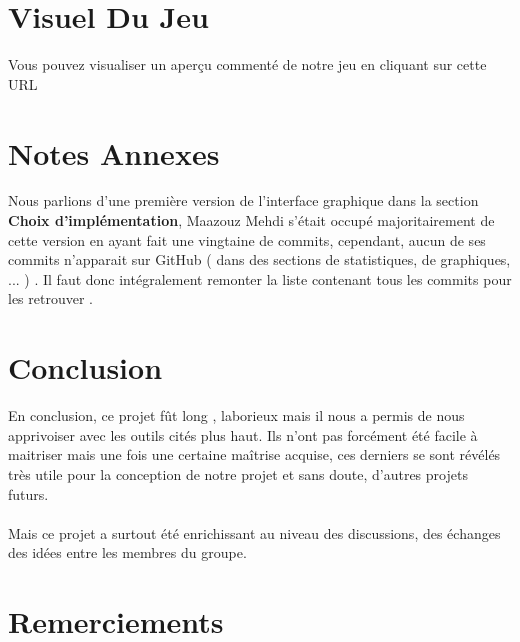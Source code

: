 \documentclass[a4paper,10pt]{article}
\begin{document}
\section{Visuel Du Jeu}
Vous pouvez visualiser un aperçu commenté de notre jeu en cliquant sur cette URL

\section{Notes Annexes}
Nous parlions d'une première version de l'interface graphique dans la section \textbf{Choix d'implémentation}, Maazouz Mehdi s'était occupé majoritairement
de cette version en ayant fait une vingtaine de commits, cependant, aucun de ses commits n'apparait sur GitHub ( dans des sections de statistiques, 
de graphiques, ... ) . Il faut donc intégralement remonter la liste contenant tous les commits pour les retrouver .
\section{Conclusion}
En conclusion, ce projet fût long , laborieux mais il nous a permis de nous apprivoiser avec les outils cités plus haut. Ils n'ont pas
forcément été facile à maitriser mais une fois une certaine maîtrise acquise, ces derniers se sont révélés très utile pour la conception de 
notre projet et sans doute, d'autres projets futurs. 
\\
\\
Mais ce projet a surtout été enrichissant au niveau des discussions, des échanges des idées entre les membres du groupe.

\section{Remerciements}
\end{document}
